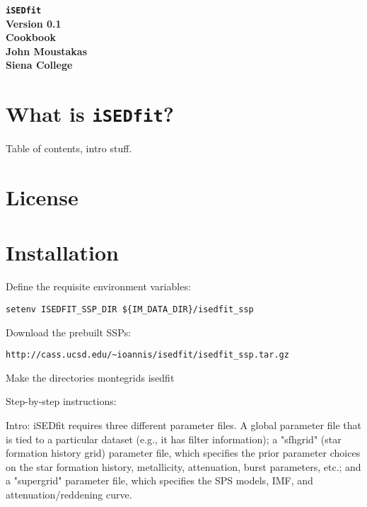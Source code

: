 \documentclass[12pt,preprint]{aastex}
\newcommand{\ised}{{\tt iSEDfit}}
\begin{document}
\vspace*{-10mm} 
\begin{center}
{\Large {\bf \ised}} \\
\vspace*{2mm} 
{\Large {\bf\sc Version 0.1}} \\
\vspace*{2mm} 
{\Large {\bf\sc Cookbook}} \\
\vspace*{0.1in} 
{\Large {\bf\sc John Moustakas}} \\
{\Large {\bf\sc Siena College}} \\
\vspace*{0.1in} 
\end{center}

\section{What is \ised?}

Table of contents, intro stuff.

\section{License}

\section{Installation}

Define the requisite environment variables:

\begin{verbatim}
setenv ISEDFIT_SSP_DIR ${IM_DATA_DIR}/isedfit_ssp
\end{verbatim}


Download the prebuilt SSPs:

\begin{verbatim}
http://cass.ucsd.edu/~ioannis/isedfit/isedfit_ssp.tar.gz
\end{verbatim}

Make the directories
montegrids
isedfit

Step-by-step instructions:

Intro: iSEDfit requires three different parameter files.  A global
parameter file that is tied to a particular dataset (e.g., it has
filter information); a "sfhgrid" (star formation history grid)
parameter file, which specifies the prior parameter choices on the
star formation history, metallicity, attenuation, burst parameters,
etc.; and a "supergrid" parameter file, which specifies the SPS
models, IMF, and attenuation/reddening curve.
\end{document}
